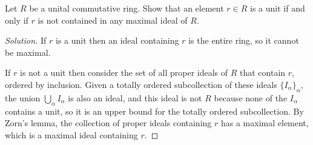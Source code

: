 \documentclass[10pt]{article}
\newenvironment{soln}{\begin{proof}[Solution]}{\end{proof}}
\begin{document}
\begin{problem}
    Let $R$ be a unital commutative ring.
    Show that an element $r\in R$ is a unit if and only if
    $r$ is not contained in any maximal ideal of $R$.
\end{problem}

\begin{soln}
    If $r$ is a unit then an ideal containing $r$
    is the entire ring, so it cannot be maximal.

    If $r$ is not a unit then consider the set of all
    proper ideals of $R$ that contain $r$, ordered by inclusion.
    Given a totally ordered subcollection of these ideals $\{I_\alpha\}_\alpha$,
    the union $\bigcup_\alpha I_\alpha$ is also an ideal,
    and this ideal is not $R$ because none of the $I_\alpha$ contains a unit,
    so it is an upper bound for the totally ordered subcollection.
    By Zorn's lemma, the collection of proper ideals containing $r$
    has a maximal element, which is a maximal ideal containing $r$.
\end{soln}
\end{document}
